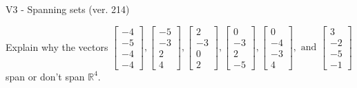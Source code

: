 \begin{exercise}
  \begin{exerciseTitle}V3 - Spanning sets (ver. 214)\end{exerciseTitle}
  \begin{exerciseStatement}
    Explain why the vectors \(\left[\begin{array}{r}
-4 \\
-5 \\
-4 \\
-4
\end{array}\right] , \left[\begin{array}{r}
-5 \\
-3 \\
2 \\
4
\end{array}\right] , \left[\begin{array}{r}
2 \\
-3 \\
0 \\
2
\end{array}\right] , \left[\begin{array}{r}
0 \\
-3 \\
2 \\
-5
\end{array}\right] , \left[\begin{array}{r}
0 \\
-4 \\
-3 \\
4
\end{array}\right] , \text{ and } \left[\begin{array}{r}
3 \\
-2 \\
-5 \\
-1
\end{array}\right]\) span or don't span \(\mathbb{R}^4\). 
	



\end{exerciseStatement}
\end{exercise}
